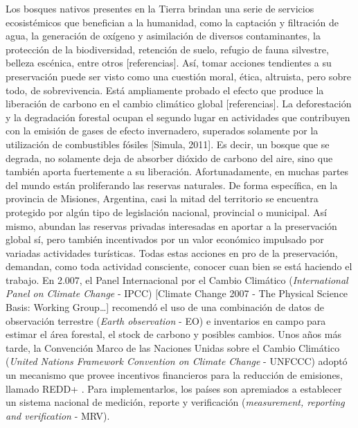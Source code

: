 
Los bosques nativos presentes en la Tierra brindan una serie de servicios ecosistémicos que benefician a la humanidad, como la captación y filtración de agua, la generación de oxígeno y asimilación de diversos contaminantes, la protección de la biodiversidad, retención de suelo, refugio de fauna silvestre, belleza escénica, entre otros \cite{}[referencias]. Así, tomar acciones tendientes a su preservación puede ser visto como una cuestión moral, ética, altruista, pero sobre todo, de sobrevivencia.
Está ampliamente probado el efecto que produce la liberación de carbono en el cambio climático global \cite{}[referencias]. La deforestación y la degradación forestal ocupan el segundo lugar en actividades que contribuyen con la emisión de gases de efecto invernadero, superados solamente por la utilización de combustibles fósiles [Simula, 2011]. Es decir, un bosque que se degrada, no solamente deja de absorber dióxido de carbono del aire, sino que también aporta fuertemente a su liberación.
Afortunadamente, en muchas partes del mundo están proliferando las reservas naturales. De forma específica, en la provincia de Misiones, Argentina, casi la mitad del territorio se encuentra protegido por algún tipo de legislación nacional, provincial o municipal. Así mismo, abundan las reservas privadas interesadas en aportar a la preservación global sí, pero también incentivados por un valor económico impulsado por variadas actividades turísticas. Todas estas acciones en pro de la preservación, demandan, como toda actividad consciente, conocer cuan bien se está haciendo el trabajo.
En 2.007, el Panel Internacional por el Cambio Climático (\textit{International Panel on Climate Change} - IPCC) [Climate Change 2007 - The Physical Science Basis: Working Group…] recomendó el uso de una combinación de datos de observación terrestre (\textit{Earth observation} - EO) e inventarios en campo para estimar el área forestal, el stock de carbono y posibles cambios.  Unos años más tarde, la Convención Marco de las Naciones Unidas sobre el Cambio Climático (\textit{United Nations Framework Convention on Climate Change} - UNFCCC) adoptó un mecanismo que provee incentivos financieros para la reducción de emisiones, llamado REDD+ \cite{pistorius_red_2012}. Para implementarlos, los países son apremiados a establecer un sistema nacional de medición, reporte y verificación (\textit{measurement, reporting and verification} - MRV). 
